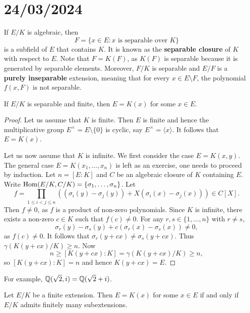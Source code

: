 \section{24/03/2024}

\label{separable}
If $E/K$ is algebraic, then 
\[
    F=\{x\in E:x\text{ is separable over }K\}
\]
is a subfield of $E$ that contains $K$. It is known as 
the \textbf{separable closure} of $K$ with respect to $E$. 
Note that $F=K(F)$, as
$K(F)$ is separable because it is generated by separable elements. Moreover, 
$F/K$ is separable and 
$E/F$ is a \textbf{purely inseparable} extension, meaning that
for every $x\in E\setminus F$, the polynomial $f(x,F)$ is not separable. 

\begin{proposition}
\label{pro:monogenic}
    If $E/K$ is separable and finite, then $E=K(x)$ for some $x\in E$. 
\end{proposition}

\begin{proof}
    Let us assume that $K$ is finite. Then $E$ is finite and hence 
    the multiplicative group $E^{\times}=E\setminus\{0\}$ 
    is cyclic, say $E^{\times}=\langle x\rangle$. It follows
    that $E=K(x)$. 
    
    Let us now assume that $K$ is infinite. We first consider the case 
    $E=K(x,y)$. The general case $E=K(x_1,\dots,x_n)$ is left as an exercise, one needs to proceed by induction. 
    Let $n=[E:K]$ and 
    $C$ be an algebraic closure of $K$ containing $E$. 
    Write $\operatorname{Hom}(E/K,C/K)=\{\sigma_1,\dots,\sigma_n\}$. Let 
    \[
    f=\prod_{1\leq i<j\leq n}\left((\sigma_i(y)-\sigma_j(y))
    +X(\sigma_i(x)-\sigma_j(x))\right)\in C[X].
    \]
    Then $f\ne 0$, as $f$ is a product of non-zero polynomials. Since $K$ is infinite, 
    there exists a non-zero 
    $c\in K$ such that $f(c)\ne 0$. For any $r,s\in\{1,\dots,n\}$ with 
    $r\ne s$,
    \[
        \sigma_r(y)-\sigma_s(y)+c(\sigma_r(x)-\sigma_s(x))\ne 0,
    \]
    as $f(c)\ne0$. It follows that $\sigma_r(y+cx)\ne\sigma_s(y+cx)$. Thus $\gamma(K(y+cx)/K)\geq n$. 
    Now 
    \[
    n\geq [K(y+cx):K]=\gamma(K(y+cx)/K)\geq n,
    \]
    so $[K(y+cx):K]=n$ and
    hence $K(y+cx)=E$. 
\end{proof}

For example, $\mathbb{Q}(\sqrt{2},i)=\mathbb{Q}(\sqrt{2}+i)$. 

\begin{proposition}
    Let $E/K$ be a finite extension. Then $E=K(x)$ for some $x\in E$ 
    if and only if $E/K$ admits finitely many subextensions. 
\end{proposition}

